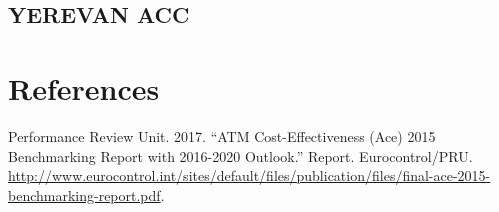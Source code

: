 \documentclass[]{book}
\begin{document}
\hypertarget{yerevan-acc}{%
\section{YEREVAN ACC}\label{yerevan-acc}}

\hypertarget{references}{%
\chapter*{References}\label{references}}

\hypertarget{refs}{}
\leavevmode\hypertarget{ref-pru:ace-report-2015}{}%
Performance Review Unit. 2017. ``ATM Cost-Effectiveness (Ace) 2015 Benchmarking Report with 2016-2020 Outlook.'' Report. Eurocontrol/PRU. \url{http://www.eurocontrol.int/sites/default/files/publication/files/final-ace-2015-benchmarking-report.pdf}.
\end{document}
